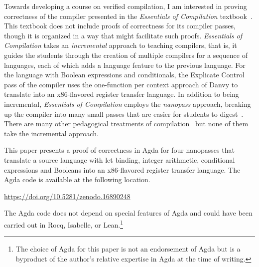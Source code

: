 \documentclass[sigplan,screen]{acmart}
\begin{document}
Towards developing a course on verified compilation, I am interested
in proving correctness of the compiler presented in the
\emph{Essentials of Compilation}
textbook~\citep{Siek:2023tr,Siek:2023ue}. This textbook does not
include proofs of correctness for its compiler passes, though it is
organized in a way that might facilitate such proofs.
%
\emph{Essentials of Compilation} takes an \emph{incremental} approach
to teaching compilers, that is, it guides the students through the
creation of multiple compilers for a sequence of languages, each of
which adds a language feature to the previous language. For the
language with Boolean expressions and conditionals, the Explicate
Control pass of the compiler uses the one-function per context
approach of Danvy to translate into an x86-flavored register transfer
language.
%
In addition to being incremental, \emph{Essentials of Compilation}
employs the \emph{nanopass} approach, breaking up the compiler into
many small passes that are easier for students to
digest~\citep{Sarkar:2004fk}.
%
There are many other pedagogical treatments of
compilation~\citep{Appel:2003fk,Sumii:2005aa,Aho:2006wb,Cooper:2011aa,Grune:2012aa}
but none of them take the incremental approach.

This paper presents a proof of correctness in Agda for four nanopasses
that translate a source language with let binding, integer arithmetic,
conditional expressions and Booleans into an x86-flavored register
transfer language. The Agda code is available at the following location.
\begin{center}
\url{https://doi.org/10.5281/zenodo.16890248}
\end{center}
The Agda code does not depend on special features of Agda and could
have been carried out in Rocq, Isabelle, or Lean.\footnote{The choice
of Agda for this paper is not an endorsement of Agda but is a
byproduct of the author's relative expertise in Agda at the time of
writing.}
\end{document}
